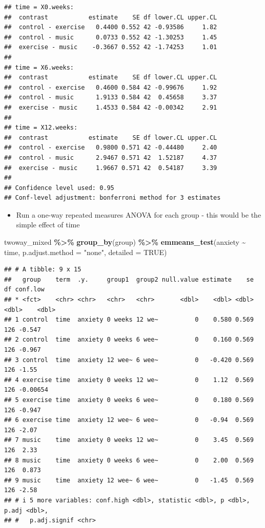\documentclass[
]{book}
\newenvironment{Shaded}{\begin{snugshade}}{\end{snugshade}}
\newcommand{\AttributeTok}[1]{\textcolor[rgb]{0.13,0.29,0.53}{#1}}
\newcommand{\ConstantTok}[1]{\textcolor[rgb]{0.56,0.35,0.01}{#1}}
\newcommand{\FunctionTok}[1]{\textcolor[rgb]{0.13,0.29,0.53}{\textbf{#1}}}
\newcommand{\NormalTok}[1]{#1}
\newcommand{\SpecialCharTok}[1]{\textcolor[rgb]{0.81,0.36,0.00}{\textbf{#1}}}
\newcommand{\StringTok}[1]{\textcolor[rgb]{0.31,0.60,0.02}{#1}}
\providecommand{\tightlist}{%
  \setlength{\itemsep}{0pt}\setlength{\parskip}{0pt}}
\begin{document}
\begin{verbatim}
## time = X0.weeks:
##  contrast           estimate    SE df lower.CL upper.CL
##  control - exercise   0.4400 0.552 42 -0.93586     1.82
##  control - music      0.0733 0.552 42 -1.30253     1.45
##  exercise - music    -0.3667 0.552 42 -1.74253     1.01
## 
## time = X6.weeks:
##  contrast           estimate    SE df lower.CL upper.CL
##  control - exercise   0.4600 0.584 42 -0.99676     1.92
##  control - music      1.9133 0.584 42  0.45658     3.37
##  exercise - music     1.4533 0.584 42 -0.00342     2.91
## 
## time = X12.weeks:
##  contrast           estimate    SE df lower.CL upper.CL
##  control - exercise   0.9800 0.571 42 -0.44480     2.40
##  control - music      2.9467 0.571 42  1.52187     4.37
##  exercise - music     1.9667 0.571 42  0.54187     3.39
## 
## Confidence level used: 0.95 
## Conf-level adjustment: bonferroni method for 3 estimates
\end{verbatim}

\begin{itemize}
\tightlist
\item
  Run a one-way repeated measures ANOVA for each group - this would be the simple effect of time
\end{itemize}

\begin{Shaded}
\begin{Highlighting}[]
\NormalTok{twoway\_mixed }\SpecialCharTok{\%\textgreater{}\%}
  \FunctionTok{group\_by}\NormalTok{(group) }\SpecialCharTok{\%\textgreater{}\%}
  \FunctionTok{emmeans\_test}\NormalTok{(anxiety }\SpecialCharTok{\textasciitilde{}}\NormalTok{ time, }\AttributeTok{p.adjust.method =} \StringTok{"none"}\NormalTok{, }\AttributeTok{detailed =} \ConstantTok{TRUE}\NormalTok{)}
\end{Highlighting}
\end{Shaded}

\begin{verbatim}
## # A tibble: 9 x 15
##   group    term  .y.     group1  group2 null.value estimate    se    df conf.low
## * <fct>    <chr> <chr>   <chr>   <chr>       <dbl>    <dbl> <dbl> <dbl>    <dbl>
## 1 control  time  anxiety 0 weeks 12 we~          0    0.580 0.569   126 -0.547  
## 2 control  time  anxiety 0 weeks 6 wee~          0    0.160 0.569   126 -0.967  
## 3 control  time  anxiety 12 wee~ 6 wee~          0   -0.420 0.569   126 -1.55   
## 4 exercise time  anxiety 0 weeks 12 we~          0    1.12  0.569   126 -0.00654
## 5 exercise time  anxiety 0 weeks 6 wee~          0    0.180 0.569   126 -0.947  
## 6 exercise time  anxiety 12 wee~ 6 wee~          0   -0.94  0.569   126 -2.07   
## 7 music    time  anxiety 0 weeks 12 we~          0    3.45  0.569   126  2.33   
## 8 music    time  anxiety 0 weeks 6 wee~          0    2.00  0.569   126  0.873  
## 9 music    time  anxiety 12 wee~ 6 wee~          0   -1.45  0.569   126 -2.58   
## # i 5 more variables: conf.high <dbl>, statistic <dbl>, p <dbl>, p.adj <dbl>,
## #   p.adj.signif <chr>
\end{verbatim}
\end{document}
